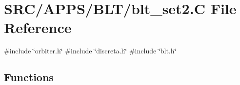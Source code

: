 \hypertarget{blt__set2_8_c}{}\section{S\+R\+C/\+A\+P\+P\+S/\+B\+L\+T/blt\+\_\+set2.C File Reference}
\label{blt__set2_8_c}
{\ttfamily \#include \char`\"{}orbiter.\+h\char`\"{}}\newline
{\ttfamily \#include \char`\"{}discreta.\+h\char`\"{}}\newline
{\ttfamily \#include \char`\"{}blt.\+h\char`\"{}}\newline
\subsection*{Functions}
